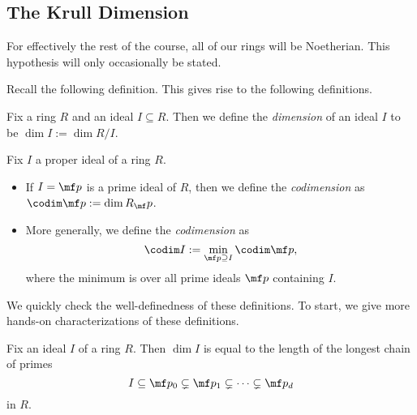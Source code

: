 \subsection{The Krull Dimension}
\begin{warn}
	For effectively the rest of the course, all of our rings will be Noetherian. This hypothesis will only occasionally be stated.
\end{warn}
Recall the following definition.
\krulldimdef*
\noindent This gives rise to the following definitions.
\begin{definition}
	Fix a ring $R$ and an ideal $I\subseteq R$. Then we define the \textit{dimension} of an ideal $I$ to be $\dim I:=\dim R/I$.
\end{definition}
\begin{definition}[Codimension]
	Fix $I$ a proper ideal of a ring $R$.
	\begin{itemize}
		\item If $I=\mf p$ is a prime ideal of $R$, then we define the \textit{codimension} as $\codim\mf p:=\dim R_\mf p$.
		\item More generally, we define the \textit{codimension} as
		\[\codim I:=\min_{\mf p\supseteq I}\codim\mf p,\]
		where the minimum is over all prime ideals $\mf p$ containing $I$.
	\end{itemize}
\end{definition}
We quickly check the well-definedness of these definitions. To start, we give more hands-on characterizations of these definitions.
\begin{lemma} \label{lem:dimisascend}
	Fix an ideal $I$ of a ring $R$. Then $\dim I$ is equal to the length of the longest chain of primes
	\[I\subseteq\mf p_0\subsetneq\mf p_1\subsetneq\cdots\subsetneq\mf p_d\]
	in $R$.
\end{lemma}
